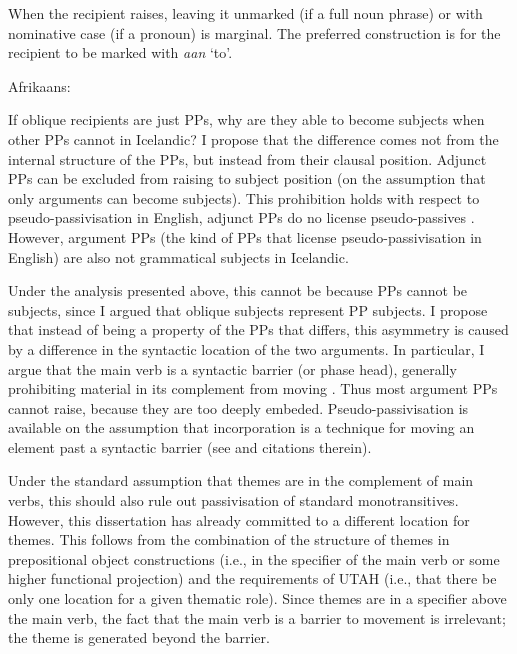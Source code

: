 When the recipient raises, leaving it unmarked (if a full noun phrase) or with nominative case (if a pronoun) is marginal. The preferred construction is for the recipient to be marked with \emph{aan} `to'.

\begin{exe}
	\ex Afrikaans: \label{ex:af-rec-pass2}
\begin{xlist}
\end{xlist}
\end{exe}

If oblique recipients are just PPs, why are they able to become subjects when other PPs cannot in Icelandic? I propose that the difference comes not from the internal structure of the PPs, but instead from their clausal position. Adjunct PPs can be excluded from raising to subject position (on the assumption that only arguments can become subjects). This prohibition holds with respect to pseudo-passivisation in English, adjunct PPs do no license pseudo-passives \citep{Hornstein.1981,Baker.1988}. However, argument PPs (the kind of PPs that license pseudo-passivisation in English) are also not grammatical subjects in Icelandic.

Under the analysis presented above, this cannot be because PPs cannot be subjects, since I argued that oblique subjects represent PP subjects. I propose that instead of being a property of the PPs that differs, this asymmetry is caused by a difference in the syntactic location of the two arguments. In particular, I argue that the main verb is a syntactic barrier (or phase head), generally prohibiting material in its complement from moving \citep{Chomsky.2001}. Thus most argument PPs cannot raise, because they are too deeply embeded. Pseudo-passivisation is available on the assumption that incorporation is a technique for moving an element past a syntactic barrier (see \citealt{Alexiadou.2013b} and citations therein). 

Under the standard assumption that themes are in the complement of main verbs, this should also rule out passivisation of standard monotransitives. However, this dissertation has already committed to a different location for themes. This follows from the combination of the structure of themes in prepositional object constructions (i.e., in the specifier of the main verb or some higher functional projection) and the requirements of UTAH (i.e., that there be only one location for a given thematic role). Since themes are in a specifier above the main verb, the fact that the main verb is a barrier to movement is irrelevant; the theme is generated beyond the barrier.

